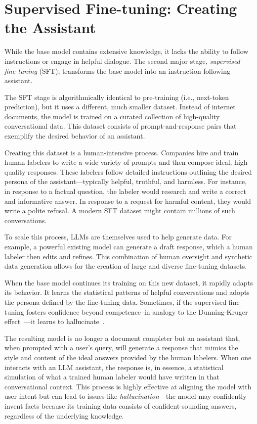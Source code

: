\documentclass[%
  reprint,
  superscriptaddress,
  showpacs,
  showkeys,
  amsmath,amssymb,
  pra,
  longbibliography,
  floatfix,
  x11names
]{revtex4-2}
\begin{document}
\section{Supervised Fine-tuning: Creating the Assistant}

While the base model contains extensive knowledge, it lacks the ability to follow instructions or engage in helpful dialogue. The second major stage, \textit{supervised fine-tuning} (SFT), transforms the base model into an instruction-following assistant.

The SFT stage is algorithmically identical to pre-training (i.e., next-token prediction), but it uses a different, much smaller dataset. Instead of internet documents, the model is trained on a curated collection of high-quality conversational data. This dataset consists of prompt-and-response pairs that exemplify the desired behavior of an assistant.

Creating this dataset is a human-intensive process. Companies hire and train human labelers to write a wide variety of prompts and then compose ideal, high-quality responses. These labelers follow detailed instructions outlining the desired persona of the assistant---typically helpful, truthful, and harmless. For instance, in response to a factual question, the labeler would research and write a correct and informative answer. In response to a request for harmful content, they would write a polite refusal. A modern SFT dataset might contain millions of such conversations.

To scale this process, LLMs are themselves used to help generate data. For example, a powerful existing model can generate a draft response, which a human labeler then edits and refines. This combination of human oversight and synthetic data generation allows for the creation of large and diverse fine-tuning datasets.

When the base model continues its training on this new dataset, it rapidly adapts its behavior.
It learns the statistical patterns of helpful conversations and adopts the persona
defined by the fine-tuning data.
Sometimes, if the supervised fine tuning fosters confidence
beyond competence--in analogy to the Dunning-Kruger effect~\cite{Kruger1999-mv}---it learns to hallucinate~\cite{Kalai2025Why}.

The resulting model is no longer a document completer but an assistant that, when prompted with a user's query, will generate a response that mimics the style and content of the ideal answers provided by the human labelers. When one interacts with an LLM assistant, the response is, in essence, a statistical simulation of what a trained human labeler would have written in that conversational context. This process is highly effective at aligning the model with user intent but can lead to issues like \textit{hallucination}---the model may confidently invent facts because its training data consists of confident-sounding answers, regardless of the underlying knowledge.
\end{document}
